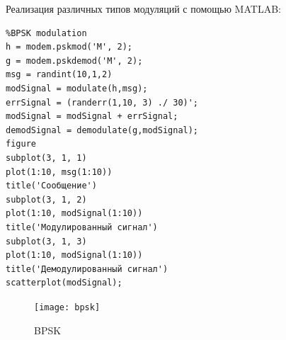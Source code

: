 \documentclass[10pt,a4paper]{article}
\begin{document}
Реализация различных типов модуляций с помощью MATLAB:
\begin{verbatim}
%BPSK modulation
h = modem.pskmod('M', 2);
g = modem.pskdemod('M', 2);
msg = randint(10,1,2)
modSignal = modulate(h,msg);
errSignal = (randerr(1,10, 3) ./ 30)';
modSignal = modSignal + errSignal;
demodSignal = demodulate(g,modSignal);
figure
subplot(3, 1, 1)
plot(1:10, msg(1:10))
title('Сообщение')
subplot(3, 1, 2)
plot(1:10, modSignal(1:10))
title('Модулированный сигнал')
subplot(3, 1, 3)
plot(1:10, modSignal(1:10))
title('Демодулированный сигнал')
scatterplot(modSignal);
\end{verbatim}
\begin{figure}[h]\centering
	\texttt{[image: bpsk]}
	\caption{BPSK}\label{fig.bpsk}
\end{figure}                                                                                                                                                                                                                                                                                                                                                                                                                                                                                                                                                                                                                                                                                                                                                                                                                                                                                                                                                                                                                                                                                                                                                                                                                                                                                                                                                                                                                                                                        
\end{document}
